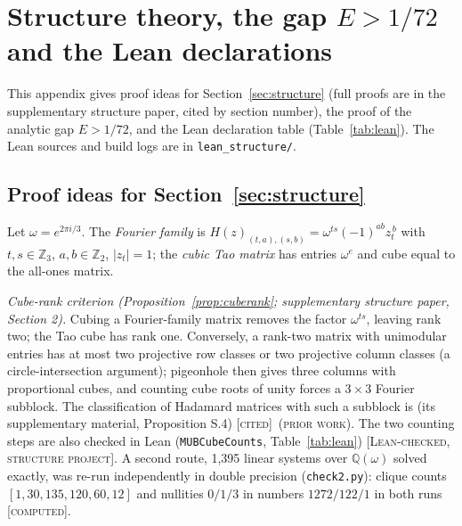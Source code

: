 \documentclass[11pt]{article}
\newcommand{\abs}[1]{\lvert #1\rvert}
\newcommand{\E}{E}                       %
\newcommand{\st}[1]{\textsc{[#1]}}
\newcommand{\stlean}{\st{Lean-checked, structure project}}
\newcommand{\stcomp}{\st{computed}}
\newcommand{\stcited}{\st{cited}}
\newcommand{\prior}{\textsc{(prior work)}}
\theoremstyle{definition}
\theoremstyle{remark}
\begin{document}
\appendix

\section{Structure theory, the gap \texorpdfstring{$E>1/72$}{E > 1/72} and the Lean declarations}\label{app:gap}

\noindent This appendix gives proof ideas for Section~\ref{sec:structure} (full proofs are in the
supplementary structure paper, cited by section number), the proof of the analytic gap $\E>1/72$, and the Lean
declaration table (Table~\ref{tab:lean}). The Lean sources and build logs are in \texttt{lean\_structure/}.

\subsection{Proof ideas for Section~\ref{sec:structure}}\label{app:terms}

Let $\omega=e^{2\pi i/3}$. The \emph{Fourier family} is $H(z)_{(t,a),(s,b)}=\omega^{ts}(-1)^{ab}z_t^{\,b}$ with
$t,s\in\mathbb{Z}_3$, $a,b\in\mathbb{Z}_2$, $\abs{z_t}=1$; the \emph{cubic Tao matrix} \cite{Tao04} has entries
$\omega^{e}$ and cube equal to the all-ones matrix.

\emph{Cube-rank criterion (Proposition~\ref{prop:cuberank}; supplementary structure paper, Section 2).} Cubing a
Fourier-family matrix removes the factor $\omega^{ts}$, leaving rank two; the Tao cube has rank one. Conversely, a
rank-two matrix with unimodular entries has at most two projective row classes or two projective column classes
(a circle-intersection argument); pigeonhole then gives three columns with proportional cubes, and counting cube
roots of unity forces a $3\times3$ Fourier subblock. The classification of Hadamard matrices with such a subblock is
\cite{CWT} (its supplementary material, Proposition S.4) \stcited\ \prior. The two counting steps are also
checked in Lean (\texttt{MUBCubeCounts}, Table~\ref{tab:lean}) \stlean. A second route, 1,395 linear systems over
$\mathbb{Q}(\omega)$ solved exactly, was re-run independently in double precision (\texttt{check2.py}): clique
counts $[1,30,135,120,60,12]$ and nullities $0/1/3$ in numbers $1272/122/1$ in both runs \stcomp.
\end{document}
